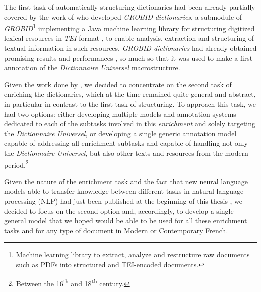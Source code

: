 The first task of automatically structuring dictionaries had been already partially covered by the work of \citet{khemakhem-etal-2017-automatic,khemakhem-etal-2018-enhancing} who developed \emph{GROBID-dictionaries}, a submodule of \emph{GROBID}\footnote{Machine learning library to extract, analyze and restructure raw documents such as PDFs into structured and TEI-encoded documents.} \citep{lopez-etal-2018-grobid} implementing a Java machine learning library for structuring digitized lexical resources in \emph{TEI} format \citep{tei-2018-guidelines}, to enable analysis, extraction and structuring of textual information in such resources. \emph{GROBID-dictionaries} had already obtained promising results and performances \citep{khemakhem-2020-standard}, so much so that it was used to make a first annotation of the \emph{Dictionnaire Universel} macrostructure.

Given the work done by \citet{khemakhem-2020-standard}, we decided to concentrate on the second task of enriching the dictionaries, which at the time remained quite general and abstract, in particular in contrast to the first task of structuring. To approach this task, we had two options: either developing multiple models and annotation systems dedicated to each of the subtasks involved in this \emph{enrichment} and solely targeting the \emph{Dictionnaire Universel}, or developing a single generic annotation model capable of addressing all enrichment subtasks and capable of handling not only the \emph{Dictionnaire Universel}, but also other texts and resources from the modern period.\footnote{Between the 16\textsuperscript{th} and 18\textsuperscript{th} century.}

Given the nature of the enrichment task and the fact that new neural language models able to transfer knowledge between different tasks in natural language processing (NLP) had just been published at the beginning of this thesis \citep{peters-etal-2018-deep,devlin-etal-2019-bert}, we decided to focus on the second option and, accordingly, to develop a single general model that we hoped would be able to be used for all these enrichment tasks and for any type of document in Modern or Contemporary French.


